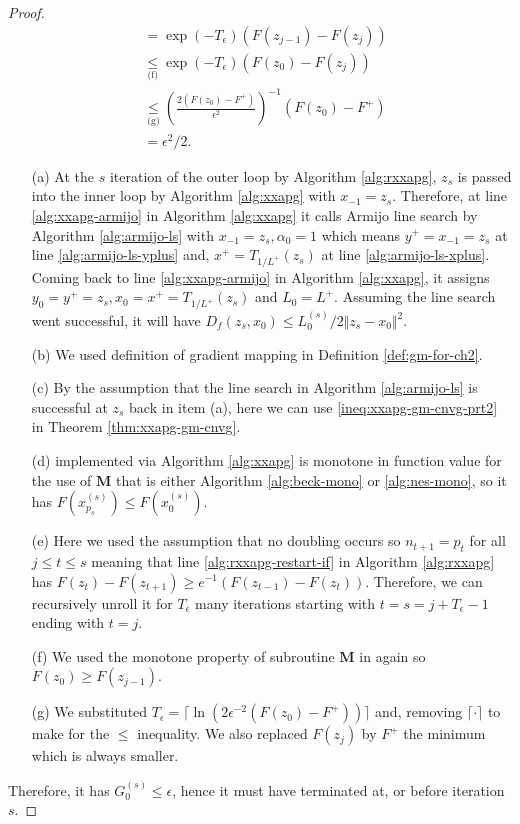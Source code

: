 \documentclass[12pt]{report}
\begin{document}
\begin{proof}
{\begin{align*}
                &= \exp(-T_\epsilon)(F(z_{j - 1}) - F(z_j)) 
                \\
                &\underset{\text{(f)}}{\le} \exp(-T_\epsilon)(F(z_{0}) - F(z_j))
                \\
                &\underset{\text{(g)}}{\le} \left(
                    \frac{2(F(z_0) - F^+)}{\epsilon^2}
                \right)^{-1}(F(z_0) - F^+) 
                \\
                &= \epsilon^2/2.
            \end{align*}
            }
            \begin{enumerate}
                \item [(a)] At the $s$ iteration of the outer loop by Algorithm \ref{alg:rxxapg}, $z_s$ is passed into the inner loop by Algorithm \ref{alg:xxapg} with $x_{-1} = z_s$. Therefore, at line \ref{alg:xxapg-armijo} in Algorithm \ref{alg:xxapg} it calls Armijo line search by Algorithm \ref{alg:armijo-ls} with $x_{-1} = z_s, \alpha_0 = 1$ which means $y^+ = x_{-1} = z_s$ at line \ref{alg:armijo-ls-yplus} and, $x^+ = T_{1/L^+}(z_s)$ at line \ref{alg:armijo-ls-xplus}. Coming back to line \ref{alg:xxapg-armijo} in Algorithm \ref{alg:xxapg}, it assigns $y_0 = y^+ = z_s, x_0 = x^+ = T_{1/L^+}(z_s)$ and $L_0 = L^+$. Assuming the line search went successful, it will have $D_f(z_s, x_0) \le L^{(s)}_0/2 \Vert z_s - x_0\Vert^2$. 
                \item [(b)] We used definition of gradient mapping in Definition \ref{def:gm-for-ch2}. 
                \item [(c)] By the assumption that the line search in Algorithm \ref{alg:armijo-ls} is successful at $z_s$ back in item (a), here we can use \eqref{ineq:xxapg-gm-cnvg-prt2} in Theorem \ref{thm:xxapg-gm-cnvg}. 
                \item [(d)] \XXAPG{} implemented via Algorithm \ref{alg:xxapg} is monotone in function value for the use of $\mathbf M$ that is either Algorithm \ref{alg:beck-mono} or \ref{alg:nes-mono}, so it has $F\left(x_{p_s}^{(s)}\right) \le F\left(x_0^{(s)}\right)$. 
                \item [(e)] Here we used the assumption that no doubling occurs so $n_{t + 1} = p_t$ for all $j \le t \le s$ meaning that line \ref{alg:rxxapg-restart-if} in Algorithm \ref{alg:rxxapg} has $F(z_t) - F(z_{t + 1}) \ge e^{-1}(F(z_{t - 1}) - F(z_t))$. Therefore, we can recursively unroll it for $T_\epsilon$ many iterations starting with $t = s = j + T_\epsilon - 1$ ending with $t = j$. 
                \item [(f)] We used the monotone property of subroutine $\mathbf M$ in \XXAPG{} again so $F(z_0) \ge F(z_{j - 1})$. 
                \item [(g)] We substituted $T_\epsilon = \lceil\ln(2\epsilon^{-2}(F(z_0) - F^+))\rceil$ and, removing $\lceil\cdot\rceil$ to make for the $\le$ inequality. We also replaced $F(z_j)$ by $F^+$ the minimum which is always smaller. 
            \end{enumerate}
            Therefore, it has $G_0^{(s)} \le \epsilon$, hence it must have terminated at, or before iteration $s$. 
        \end{proof}
\end{document}

